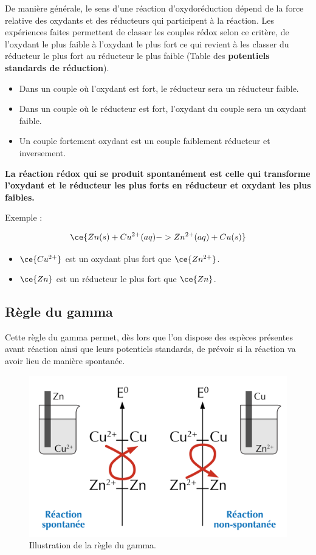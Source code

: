 \documentclass[
  11pt,
  a4paper,
  openany]{book}
\providecommand{\tightlist}{%
  \setlength{\itemsep}{0pt}\setlength{\parskip}{0pt}}
\begin{document}
De manière générale, le sens d'une réaction d'oxydoréduction dépend de la force relative des oxydants et des réducteurs qui participent à la réaction. Les expériences faites permettent de classer les couples rédox selon ce critère, de l'oxydant le plus faible à l'oxydant le plus fort ce qui revient à les classer du réducteur le plus fort au réducteur le plus faible (Table des \textbf{potentiels standards de réduction}).

\begin{itemize}
\tightlist
\item
  Dans un couple où l'oxydant est fort, le réducteur sera un réducteur faible.
\item
  Dans un couple où le réducteur est fort, l'oxydant du couple sera un oxydant faible.
\item
  Un couple fortement oxydant est un couple faiblement réducteur et inversement.
\end{itemize}

\textbf{La réaction rédox qui se produit spontanément est celle qui transforme l'oxydant et le réducteur les plus forts en réducteur et oxydant les plus faibles.}

Exemple :

\[
\ce{Zn(s) + Cu^{2+}(aq) -> Zn^{2+}(aq) + Cu(s)}
\]

\begin{itemize}
\tightlist
\item
  \(\ce{Cu^{2+}}\) est un oxydant plus fort que \(\ce{Zn^{2+}}\).
\item
  \(\ce{Zn}\) est un réducteur le plus fort que \(\ce{Zn}\).
\end{itemize}

\hypertarget{ruxe8gle-du-gamma}{%
\subsection{Règle du gamma}\label{ruxe8gle-du-gamma}}

Cette règle du gamma permet, dès lors que l'on dispose des espèces présentes avant réaction ainsi que leurs potentiels standards, de prévoir si la réaction va avoir lieu de manière spontanée.

\begin{figure}

{\centering \includegraphics[width=0.45\linewidth]{images/gamma-rule} 

}

\caption{Illustration de la règle du gamma.}\label{fig:gamma-rule}
\end{figure}
\end{document}

